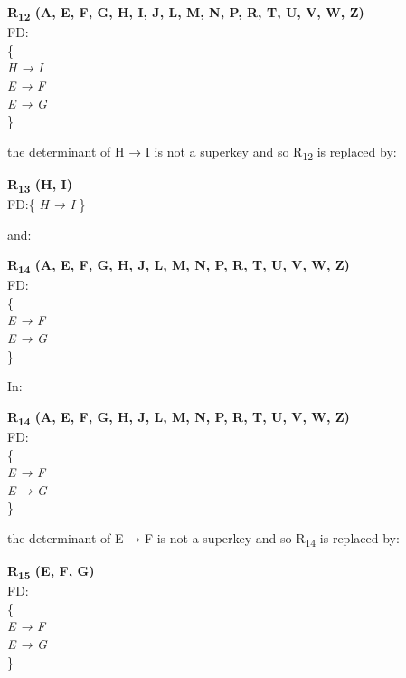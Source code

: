\begin{adjustwidth}{2cm}{}
\textbf{R\textsubscript{12} (A, E, F, G, H, I, J, L, M, N, P, R, T, U, V, W, Z)}\\
FD:\\
\{\\
\textit{ 
H → I\\
E → F\\
E → G\\
}
\} \\
\end{adjustwidth} 

the determinant of H → I is not a superkey and so R\textsubscript{12} is replaced by:

\begin{adjustwidth}{2cm}{}
\textbf{R\textsubscript{13} (H, I)}\\
FD:\{
\textit{ 
H → I 
}
\} \\
\end{adjustwidth} 

and:\\

\begin{adjustwidth}{2cm}{}
\textbf{R\textsubscript{14} (A, E, F, G, H, J, L, M, N, P, R, T, U, V, W, Z)}\\
FD:\\
\{\\
\textit{ 
E → F\\
E → G\\
}
\} \\
\end{adjustwidth} 

In:\\

\begin{adjustwidth}{2cm}{}
\textbf{R\textsubscript{14} (A, E, F, G, H, J, L, M, N, P, R, T, U, V, W, Z)}\\
FD:\\
\{\\
\textit{ 
E → F\\
E → G\\
}
\} \\
\end{adjustwidth} 

the determinant of E → F is not a superkey and so R\textsubscript{14} is replaced by:

\begin{adjustwidth}{2cm}{}
\textbf{R\textsubscript{15} (E, F, G)}\\
FD:\\
\{\\
\textit{ 
E → F\\
E → G\\
}
\} \\
\end{adjustwidth}

